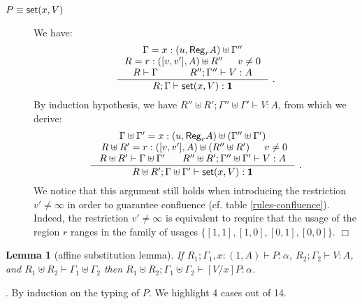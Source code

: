 \documentclass[11pt]{article}
\newtheorem{lemma}[theorem]{Lemma}
\newcommand{\Proof}{\noindent {\sc Proof}. }
\newcommand{\qed}{\hfill${\Box}$}
\newcommand{\set}[1]{\{#1\}}
\newcommand{\st}[2]{{\sf set}(#1,#2)}
\newcommand{\regtype}[2]{{\sf Reg}_{#1} #2}
\newcommand{\upair}[2]{[#1,#2]}
\begin{document}
\begin{description}
\item[$P \equiv \st{x}{V}$] We have:
    $$
    \inference
    {\Gamma=x:(u,\regtype{r}A)\uplus\Gamma''\\
      R=r:(\upair{v}{v'},A)\uplus R'' & v \neq 0\\
      R\vdash\Gamma & R'';\Gamma''\vdash V:A}
    {R;\Gamma \vdash \st{x}{V}:\tertype}~.
    $$
    By induction hypothesis, we have $R''\uplus R';\Gamma''\uplus\Gamma'\vdash V:A$, from which we derive:
    $$
    \inference
    {\Gamma\uplus \Gamma' =x:(u,\regtype{r}{A})\uplus(\Gamma''\uplus\Gamma')\\\
      R\uplus R' =r:(\upair{v}{v'},A)\uplus(R''\uplus R') & v \neq 0\\
      R\uplus R'\vdash\Gamma\uplus \Gamma' & 
     R''\uplus R';\Gamma''\uplus\Gamma'\vdash V:A}
    {R\uplus R';\Gamma\uplus \Gamma' \vdash \st{x}{V}:\tertype}~.
    $$
We notice that this argument still holds when introducing 
the restriction $v'\neq \infty$  in order to guarantee confluence
(cf. table \ref{rules-confluence}). Indeed, the restriction 
$v'\neq \infty$ is equivalent to require that the
usage of the region $r$ ranges in the family of usages
$\set{\upair{1}{1},\upair{1}{0},\upair{0}{1},\upair{0}{0}}$. \qed
  \end{description}



\begin{lemma}[affine substitution lemma] \label{aff-sub-lem}
  If $R_1;\Gamma_1,x:(1,A) \vdash P:\alpha$,
     $R_2;\Gamma_2 \vdash V:A$,  and 
     $R_1 \uplus R_2 \vdash \Gamma_1 \uplus \Gamma_2$ then 
     $R_1 \uplus R_2;\Gamma_1 \uplus \Gamma_2 \vdash [V/x]P : \alpha$.
\end{lemma}
\Proof
  By induction on the typing  of $P$. We highlight 
  4 cases out of 14.
\end{document}
